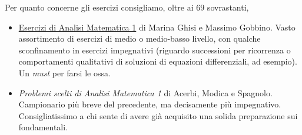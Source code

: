 \documentclass[a4paper,twoside]{article}
\theoremstyle{definition}
\numberwithin{theorem}{section}
\begin{document}
Per quanto concerne gli esercizi consigliamo, oltre ai $69$ sovrastanti, 
\begin{itemize}
 \item \href{https://pagine.dm.unipi.it/gobbino/Home_Page/Files/HP_AD/Eserciziari/AM1_Esercizi.pdf}{Esercizi di Analisi Matematica 1} di Marina Ghisi e Massimo Gobbino. Vasto assortimento di esercizi di medio o medio-basso livello, con qualche sconfinamento in esercizi impegnativi (riguardo successioni per ricorrenza o comportamenti qualitativi di soluzioni di equazioni differenziali, ad esempio). Un \emph{must} per farsi le ossa.
 \item \emph{Problemi scelti di Analisi Matematica 1} di Acerbi, Modica e Spagnolo. Campionario più breve del precedente, ma decisamente più impegnativo. Consigliatissimo a chi sente di avere già acquisito una solida preparazione sui fondamentali.
 
\end{itemize}
\end{document}
